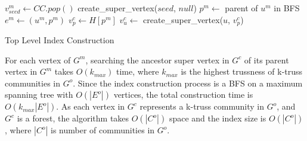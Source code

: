 \begin{algorithm}
	\BlankLine
	 {
		$v^{m}_{seed} \gets CC.pop()$\;
		create\_super\_vertex($seed$, $null$)\;
		 {
			$p^m \gets$ parent of $u^m$ in BFS\;
			$e^m \gets (u^m, p^m)$\;
			$v^{c}_{p} \gets H[p^m]$\;
			\lWhile{$\tau_{v^{c}_{p}} > \tau_{e^m}$}{
					${v^{c}_{p}}^{\prime} \gets v^{c}_{p}$, $v^{c}_{p} \gets v^{c}_{p}.parent$
			}
			 {
				 {
					$v^{c}_{u} \gets$ create\_super\_vertex($u$, $v^{c}_{p}$)\;
				}
			}
		}
	}
	\BlankLine
	\caption{Top Level Index Construction}
	\label{alg:\treeindex{}_construction}
\end{algorithm}

For each vertex of $G^m$, searching the ancestor super vertex in $G^c$ of its parent vertex in $G^m$ takes $O(k_{max})$ time, where $k_{max}$ is the highest trussness of k-truss communities in $G^o$. Since the index construction process is a BFS on a maximum spanning tree with $O(|E^o|)$ vertices, the total construction time is $O(k_{max}|E^o|)$. As each vertex in $G^c$ represents a k-truss community in $G^o$, and $G^c$ is a forest, the algorithm takes $O(|C^o|)$ space and the index size is $O(|C^o|)$, where $|C^o|$ is number of communities in $G^o$. 
%
%
